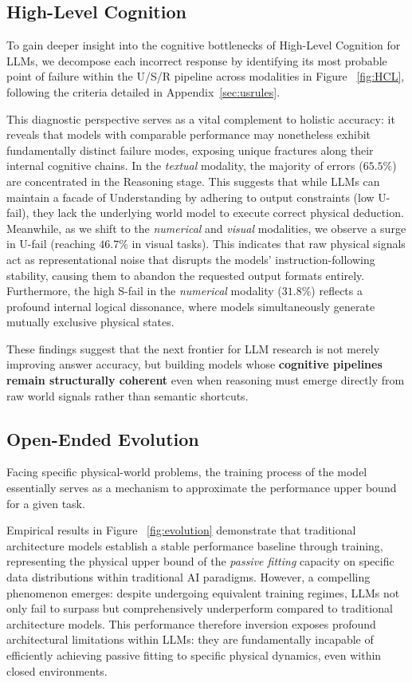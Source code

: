 \subsection{High-Level Cognition}
\label{HLC}

To gain deeper insight into the cognitive bottlenecks of High-Level Cognition for LLMs, we decompose each incorrect response by identifying its most probable point of failure within the U/S/R pipeline across modalities in Figure ~\ref{fig:HCL}, following the criteria detailed in Appendix~\ref{sec:usrules}. 

This diagnostic perspective serves as a vital complement to holistic accuracy: it reveals that models with comparable performance may nonetheless exhibit fundamentally distinct failure modes, exposing unique fractures along their internal cognitive chains. 
In the \emph{textual} modality, the majority of errors ($65.5\%$) are concentrated in the Reasoning stage. 
This suggests that while LLMs can maintain a facade of Understanding by adhering to output constraints (low U-fail), they lack the underlying world model to execute correct physical deduction. 
Meanwhile, as we shift to the \emph{numerical} and \emph{visual} modalities, we observe a surge in U-fail (reaching $46.7\%$ in visual tasks). 
This indicates that raw physical signals act as representational noise that disrupts the models' instruction-following stability, causing them to abandon the requested output formats entirely. 
Furthermore, the high S-fail in the \emph{numerical} modality ($31.8\%$) reflects a profound internal logical dissonance, where models simultaneously generate mutually exclusive physical states. 

These findings suggest that the next frontier for LLM research is not merely improving answer accuracy, but building models whose \textbf{cognitive pipelines remain structurally coherent} even when reasoning must emerge directly from raw world signals rather than semantic shortcuts.


\subsection{Open-Ended Evolution}
\label{evolution}
Facing specific physical-world problems, the training process of the model essentially serves as a mechanism to approximate the performance upper bound for a given task.

Empirical results in Figure ~\ref{fig:evolution} demonstrate that traditional architecture models establish a stable performance baseline through training, representing the physical upper bound of the \emph{passive fitting} capacity on specific data distributions within traditional AI paradigms. 
However, a compelling phenomenon emerges: 
despite undergoing equivalent training regimes, LLMs not only fail to surpass but comprehensively underperform compared to traditional architecture models. 
This performance therefore inversion exposes profound architectural limitations within LLMs: 
they are fundamentally incapable of efficiently achieving passive fitting to specific physical dynamics, even within closed environments. 

